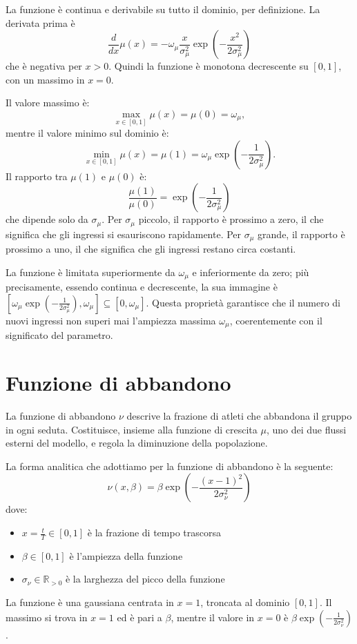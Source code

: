 La funzione è continua e derivabile su tutto il dominio, per definizione. La derivata prima è
\[
    \frac{d}{dx} \mu(x) = -\omega_\mu \frac{x}{\sigma_\mu^2} \exp\left(-\frac{x^2}{2 \sigma_\mu^2}\right)
\]
che è negativa per $x > 0$. Quindi la funzione è monotona decrescente su $[0, 1]$, con un massimo in $x = 0$.

Il valore massimo è:
\[
    \max_{x \in [0, 1]} \mu(x) = \mu(0) = \omega_\mu,
\]
mentre il valore minimo sul dominio è:
\[
    \min_{x \in [0, 1]} \mu(x) = \mu(1) = \omega_\mu \exp\left(-\frac{1}{2 \sigma_\mu^2}\right).
\]
Il rapporto tra $\mu(1)$ e $\mu(0)$ è:
\[
    \frac{\mu(1)}{\mu(0)} = \exp\left(-\frac{1}{2 \sigma_\mu^2}\right)
\]
che dipende solo da $\sigma_\mu$. Per $\sigma_\mu$ piccolo, il rapporto è prossimo a zero, il che significa che gli ingressi si esauriscono rapidamente. Per $\sigma_\mu$ grande, il rapporto è prossimo a uno, il che significa che gli ingressi restano circa costanti. \par

La funzione è limitata superiormente da $\omega_\mu$ e inferiormente da zero; più precisamente, essendo continua e decrescente, la sua immagine è $\left[\omega_\mu \exp\left(-\frac{1}{2 \sigma_\mu^2}\right), \omega_\mu\right] \subseteq [0, \omega_\mu]$. Questa proprietà garantisce che il numero di nuovi ingressi non superi mai l'ampiezza massima $\omega_\mu$, coerentemente con il significato del parametro.

\section{Funzione di abbandono}

La funzione di abbandono $\nu$ descrive la frazione di atleti che abbandona il gruppo in ogni seduta. Costituisce, insieme alla funzione di crescita $\mu$, uno dei due flussi esterni del modello, e regola la diminuzione della popolazione. \par

La forma analitica che adottiamo per la funzione di abbandono è la seguente:
\[
    \nu(x, \beta) = \beta \exp\left(-\frac{(x - 1)^2}{2 \sigma_\nu^2}\right)
\]
dove:
\begin{itemize}
    \item $x = \frac{t}{T} \in [0, 1]$ è la frazione di tempo trascorsa
    \item $\beta \in [0, 1]$ è l'ampiezza della funzione
    \item $\sigma_\nu \in \mathbb{R}_{> 0}$ è la larghezza del picco della funzione
\end{itemize}
La funzione è una gaussiana centrata in $x = 1$, troncata al dominio $[0, 1]$. Il massimo si trova in $x = 1$ ed è pari a $\beta$, mentre il valore in $x = 0$ è $\beta \exp\left(-\frac{1}{2 \sigma_\nu^2}\right)$. \par

